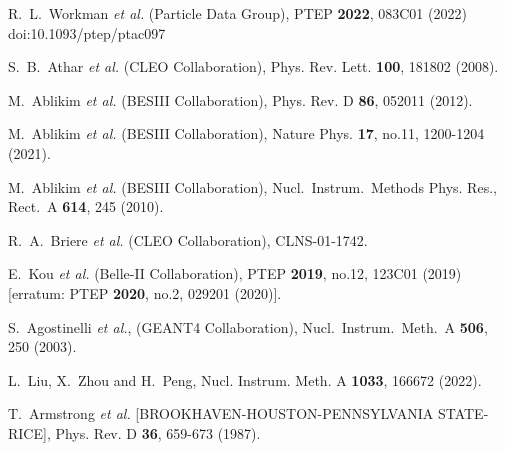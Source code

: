 \documentclass[aps,preprint,showkeys,superscriptaddress]{revtex4}
\begin{document}
\begin{thebibliography}{40}

R.~L.~Workman \textit{et al.} (Particle Data Group),
PTEP \textbf{2022}, 083C01 (2022)
doi:10.1093/ptep/ptac097

S.~B.~Athar \textit{et al.} (CLEO Collaboration),
Phys. Rev. Lett. \textbf{100}, 181802 (2008).

M.~Ablikim \textit{et al.} (BESIII Collaboration),
Phys. Rev. D \textbf{86}, 052011 (2012).

M.~Ablikim \textit{et al.} (BESIII Collaboration),
Nature Phys. \textbf{17}, no.11, 1200-1204 (2021).

 M.~Ablikim {\it et al.} (BESIII Collaboration), Nucl.\ Instrum.\ Methods Phys. Res., Rect.\ A {\bf 614}, 245 (2010).

R.~A.~Briere \textit{et al.} (CLEO Collaboration),
CLNS-01-1742.

E.~Kou \textit{et al.} (Belle-II Collaboration),
PTEP \textbf{2019}, no.12, 123C01 (2019)
[erratum: PTEP \textbf{2020}, no.2, 029201 (2020)].

 S.~Agostinelli {\it et al.}, (GEANT4 Collaboration), Nucl.\ Instrum.\ Meth.\ A {\bf 506}, 250 (2003). %

L.~Liu, X.~Zhou and H.~Peng,
Nucl. Instrum. Meth. A \textbf{1033}, 166672 (2022).

T.~Armstrong \textit{et al.} [BROOKHAVEN-HOUSTON-PENNSYLVANIA STATE-RICE],
Phys. Rev. D \textbf{36}, 659-673 (1987).


\end{thebibliography}
\end{document}
